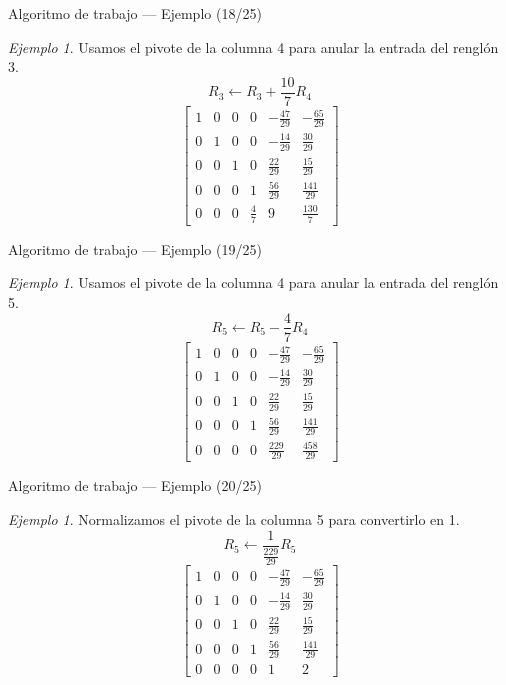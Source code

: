 \documentclass[aspectratio=169,11pt]{beamer}
\theoremstyle{remark}
\newtheorem{Ejem}[definicion]{Ejemplo}
\begin{document}
\begin{frame}{Algoritmo de trabajo — Ejemplo (18/25)}
\begin{Ejem}
Usamos el pivote de la columna 4 para anular la entrada del renglón 3.
\[
R_{3}\leftarrow R_{3}+\frac{10}{7}R_{4}
\]
\[
\left[\begin{array}{ccccc|c}
1 & 0 & 0 & 0 & - \frac{47}{29} & - \frac{65}{29}\\
0 & 1 & 0 & 0 & - \frac{14}{29} & \frac{30}{29}\\
0 & 0 & 1 & 0 & \frac{22}{29} & \frac{15}{29}\\
0 & 0 & 0 & 1 & \frac{56}{29} & \frac{141}{29}\\
0 & 0 & 0 & \frac{4}{7} & 9 & \frac{130}{7}
\end{array}\right]
\]
\end{Ejem}
\end{frame}

\begin{frame}{Algoritmo de trabajo — Ejemplo (19/25)}
\begin{Ejem}
Usamos el pivote de la columna 4 para anular la entrada del renglón 5.
\[
R_{5}\leftarrow R_{5}-\frac{4}{7}R_{4}
\]
\[
\left[\begin{array}{ccccc|c}
1 & 0 & 0 & 0 & - \frac{47}{29} & - \frac{65}{29}\\
0 & 1 & 0 & 0 & - \frac{14}{29} & \frac{30}{29}\\
0 & 0 & 1 & 0 & \frac{22}{29} & \frac{15}{29}\\
0 & 0 & 0 & 1 & \frac{56}{29} & \frac{141}{29}\\
0 & 0 & 0 & 0 & \frac{229}{29} & \frac{458}{29}
\end{array}\right]
\]
\end{Ejem}
\end{frame}

\begin{frame}{Algoritmo de trabajo — Ejemplo (20/25)}
\begin{Ejem}
Normalizamos el pivote de la columna 5 para convertirlo en 1.
\[
R_{5}\leftarrow \frac{1}{\frac{229}{29}}R_{5}
\]
\[
\left[\begin{array}{ccccc|c}
1 & 0 & 0 & 0 & - \frac{47}{29} & - \frac{65}{29}\\
0 & 1 & 0 & 0 & - \frac{14}{29} & \frac{30}{29}\\
0 & 0 & 1 & 0 & \frac{22}{29} & \frac{15}{29}\\
0 & 0 & 0 & 1 & \frac{56}{29} & \frac{141}{29}\\
0 & 0 & 0 & 0 & 1 & 2
\end{array}\right]
\]
\end{Ejem}
\end{frame}
\end{document}
